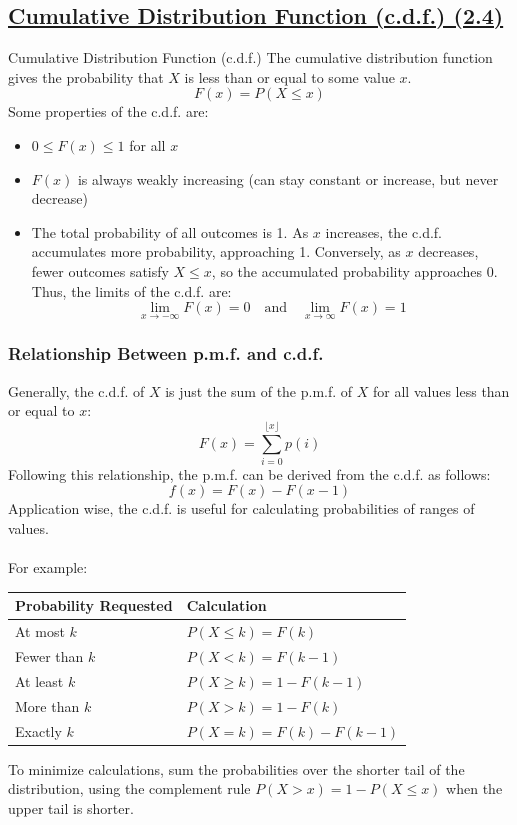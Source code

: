 ﻿\documentclass[12pt]{article}
\begin{document}
\subsection*{\underline{Cumulative Distribution Function (c.d.f.) (2.4)}}
\begin{definition}{Cumulative Distribution Function (c.d.f.)}
    The cumulative distribution function gives the probability that \(X\) is less than or equal to some value \(x\).
    \[\boxed{F(x)=P(X\leq x)}\]
    Some properties of the c.d.f. are:
    \begin{itemize}
        \item $0 \leq F(x) \leq 1$ for all $x$
        \item $F(x)$ is always weakly increasing (can stay constant or increase, but never decrease)
        \item The total probability of all outcomes is 1. As \(x\) increases, the c.d.f. accumulates more probability, approaching 1. Conversely, as \(x\) decreases, fewer outcomes satisfy \(X\leq x\), so the accumulated probability approaches 0. Thus, the limits of the c.d.f. are:
        \[\lim_{x \to -\infty} F(x) = 0 \quad \text{and} \quad \lim_{x \to \infty} F(x) = 1\]
    \end{itemize}
\end{definition}
\subsubsection*{Relationship Between p.m.f. and c.d.f.}
Generally, the c.d.f. of $X$ is just the sum of the p.m.f. of $X$ for all values less than or equal to $x$:
\[F(x) = \sum_{i=0}^{\lfloor x \rfloor} p(i)\]
Following this relationship, the p.m.f. can be derived from the c.d.f. as follows:
\[f(x) = F(x) - F(x-1)\]
Application wise, the c.d.f. is useful for calculating probabilities of ranges of values.\\\\
For example:
\begin{center}
\begin{tabular}{ll}
\hline
\textbf{Probability Requested} & \textbf{Calculation} \\
\hline
At most $k$    & $P(X \leq k) = F(k)$ \\
Fewer than $k$ & $P(X < k) = F(k-1)$ \\
At least $k$   & $P(X \geq k) = 1-F(k-1)$ \\
More than $k$  & $P(X > k) = 1-F(k)$ \\
Exactly $k$    & $P(X = k) = F(k)-F(k-1)$ \\
\hline
\end{tabular}
\end{center}
To minimize calculations, sum the probabilities over the shorter tail of the distribution, using the complement rule $P(X> x)=1-P(X\leq x)$ when the upper tail is shorter.
\end{document}
